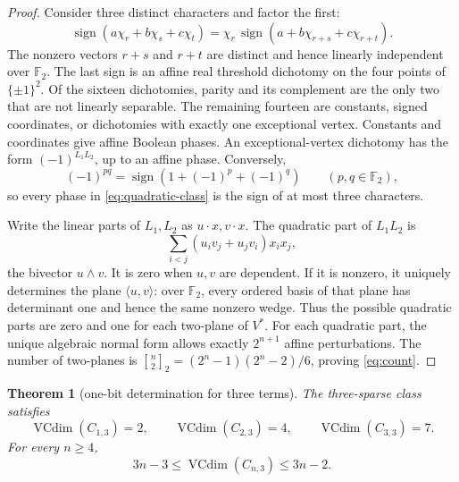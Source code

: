 \documentclass[11pt]{article}
\newtheorem{theorem}{Theorem}
\newcommand{\F}{\mathbb F}
\newcommand{\VC}{\operatorname{VCdim}}
\newcommand{\sign}{\operatorname{sign}}
\newcommand{\qbinom}[2]{\genfrac{[}{]}{0pt}{}{#1}{#2}_2}
\begin{document}
\begin{proof}
Consider three distinct characters and factor the first:
\[
 \sign(a\chi_r+b\chi_s+c\chi_t)
 =\chi_r\,\sign(a+b\chi_{r+s}+c\chi_{r+t}).
\]
The nonzero vectors \(r+s\) and \(r+t\) are distinct and hence linearly
independent over \(\F_2\).  The last sign is an affine real threshold
dichotomy on the four points of \(\{\pm1\}^2\).  Of the sixteen
dichotomies, parity and its complement are the only two that are not linearly
separable.  The remaining fourteen are constants, signed coordinates, or
dichotomies with exactly one exceptional vertex.  Constants and coordinates
give affine Boolean phases.  An exceptional-vertex dichotomy has the form
\((-1)^{L_1L_2}\), up to an affine phase.  Conversely,
\[
 (-1)^{pq}=\sign(1+(-1)^p+(-1)^q)
 \qquad(p,q\in\F_2),
\]
so every phase in \eqref{eq:quadratic-class} is the sign of at most three
characters.

Write the linear parts of \(L_1,L_2\) as \(u\cdot x,v\cdot x\).  The
quadratic part of \(L_1L_2\) is
\[
 \sum_{i<j}(u_iv_j+u_jv_i)x_ix_j,
\]
the bivector \(u\wedge v\).  It is zero when \(u,v\) are dependent.  If it
is nonzero, it uniquely determines the plane \(\langle u,v\rangle\): over
\(\F_2\), every ordered basis of that plane has determinant one and hence the
same nonzero wedge.  Thus the possible quadratic parts are zero and one for
each two-plane of \(V^*\).  For each quadratic part, the unique algebraic
normal form allows exactly \(2^{n+1}\) affine perturbations.  The number of
two-planes is \(\qbinom{n}{2}=(2^n-1)(2^n-2)/6\), proving
\eqref{eq:count}.
\end{proof}

\begin{theorem}[one-bit determination for three terms]\label{thm:main}
The three-sparse class satisfies
\[
 \VC(C_{1,3})=2,\qquad \VC(C_{2,3})=4,\qquad
 \VC(C_{3,3})=7.
\]
For every \(n\ge4\),
\begin{equation}\label{eq:one-bit}
 3n-3\le \VC(C_{n,3})\le3n-2.
\end{equation}
\end{theorem}
\end{document}
